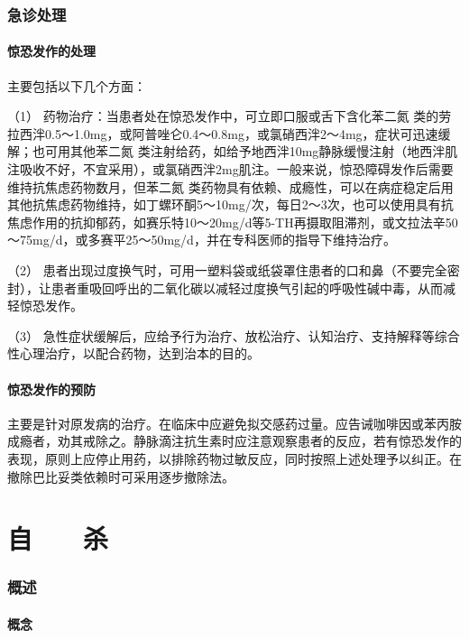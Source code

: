 \subsubsection{急诊处理}

\paragraph{惊恐发作的处理}

主要包括以下几个方面：

（1） 药物治疗：当患者处在惊恐发作中，可立即口服或舌下含化苯二氮{}
类的劳拉西泮0.5～1.0mg，或阿普唑仑0.4～0.8mg，或氯硝西泮2～4mg，症状可迅速缓解；也可用其他苯二氮{}
类注射给药，如给予地西泮10mg静脉缓慢注射（地西泮肌注吸收不好，不宜采用），或氯硝西泮2mg肌注。一般来说，惊恐障碍发作后需要维持抗焦虑药物数月，但苯二氮{}
类药物具有依赖、成瘾性，可以在病症稳定后用其他抗焦虑药物维持，如丁螺环酮5～10mg/次，每日2～3次，也可以使用具有抗焦虑作用的抗抑郁药，如赛乐特10～20mg/d等5-TH再摄取阻滞剂，或文拉法辛50～75mg/d，或多赛平25～50mg/d，并在专科医师的指导下维持治疗。

（2）
患者出现过度换气时，可用一塑料袋或纸袋罩住患者的口和鼻（不要完全密封），让患者重吸回呼出的二氧化碳以减轻过度换气引起的呼吸性碱中毒，从而减轻惊恐发作。

（3）
急性症状缓解后，应给予行为治疗、放松治疗、认知治疗、支持解释等综合性心理治疗，以配合药物，达到治本的目的。

\paragraph{惊恐发作的预防}

主要是针对原发病的治疗。在临床中应避免拟交感药过量。应告诫咖啡因或苯丙胺成瘾者，劝其戒除之。静脉滴注抗生素时应注意观察患者的反应，若有惊恐发作的表现，原则上应停止用药，以排除药物过敏反应，同时按照上述处理予以纠正。在撤除巴比妥类依赖时可采用逐步撤除法。

\protect\hypertarget{text00052.html}{}{}

\section{自　　杀}

\subsubsection{概述}

\paragraph{概念}

